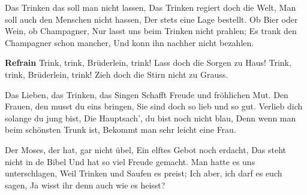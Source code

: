 \footnotemark [
ititle={Trink, trink, Brüderlein, trink}]


\beginverse
Das Trinken das soll man nicht lassen,
Das Trinken regiert doch die Welt,
Man soll auch den Menschen nicht hassen,
Der stets eine Lage bestellt.
Ob Bier oder Wein, ob Champagner,
Nur lasst uns beim Trinken nicht prahlen;
Es trank den Champagner schon mancher,
Und konn ihn nachher nicht bezahlen.
\endverse

\beginchorus
\textbf{Refrain}
Trink, trink, Brüderlein, trink!
Lass doch die Sorgen zu Haus!
Trink, trink, Brüderlein, trink!
Zieh doch die Stirn nicht zu Grauss.
\endchorus

\beginverse
Das Lieben, das Trinken, das Singen
Schafft Freude und fröhlichen Mut.
Den Frauen, den musst du eins bringen,
Sie sind doch so lieb und so gut.
Verlieb dich solange du jung bist,
Die Hauptsach', du bist noch nicht blau,
Denn wenn man beim schönsten Trunk ist,
Bekommt man sehr leicht eine Frau.
\endverse

\beginverse
Der Moses, der hat, gar nicht übel,
Ein elftes Gebot noch erdacht,
Das steht nicht in de Bibel
Und hat so viel Freude gemacht.
Man hatte es uns unterschlagen,
Weil Trinken und Saufen es preist;
Ich aber, ich darf es euch sagen,
Ja wisst ihr denn auch wie es heisst?
\endverse
\endsong